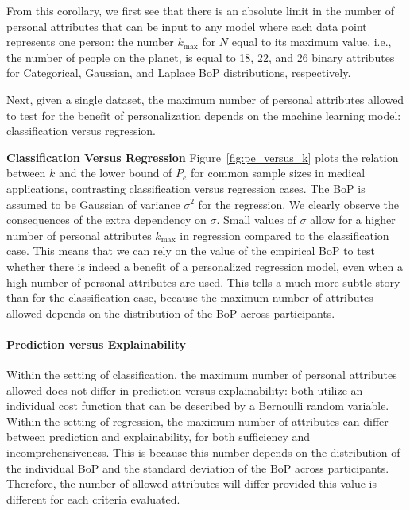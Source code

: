 From this corollary, we first see that there is an absolute limit in the number of personal attributes that can be input to any model where each data point represents one person: the number $k_\text{max}$ for $N$ equal to its maximum value, i.e., the number of people on the planet, is equal to 18, 22, and 26 binary attributes for Categorical, Gaussian, and Laplace BoP distributions, respectively. 

Next, given a single dataset, the maximum number of personal attributes allowed to test for the benefit of personalization depends on the machine learning model: classification versus regression.

\textbf{Classification Versus Regression}
Figure~\ref{fig:pe_versus_k} plots the relation between $k$ and the lower bound of $P_e$ for common sample sizes in medical applications, contrasting classification versus regression cases. The BoP is assumed to be Gaussian of variance $\sigma^2$ for the regression. We clearly observe the consequences of the extra dependency on $\sigma$. Small values of $\sigma$ allow for a higher number of personal attributes $k_\text{max}$ in regression compared to the classification case. This means that we can rely on the value of the empirical BoP to test whether there is indeed a benefit of a personalized regression model, even when a high number of personal attributes are used. This tells a much more subtle story than for the classification case, because the maximum number of attributes allowed depends on the distribution of the BoP across participants. 

\paragraph{Prediction versus Explainability}

Within the setting of classification, the maximum number of personal attributes allowed does not differ in prediction versus explainability: both utilize an individual cost function that can be described by a Bernoulli random variable.  Within the setting of regression, the maximum number of attributes can differ between prediction and explainability, for both sufficiency and incomprehensiveness. This is because this number depends on the distribution of the individual BoP and the standard deviation of the BoP across participants. Therefore,  the number of allowed attributes will differ provided this value is different for each criteria evaluated. 


